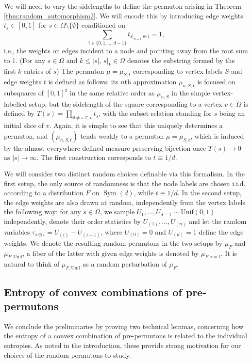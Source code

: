 \documentclass[11pt]{article}
\newcommand{\Sym}{\mathop{\mathrm{Sym}}}
\theoremstyle{definition}
\begin{document}
We will need to vary the sidelengths to define the permuton arising in Theorem \ref{thm:random_automorphism2}. We will encode this by introducing edge weights $t_s\in [0, 1]$ for $s\in {\Omega\setminus\{\emptyset\}}$ conditioned on
$$\sum_{i\in \{0, 1, \dots, d-1\}}t_{s|_{n-1}\oplus i}=1,$$
i.e., the weights on edges incident to a node and pointing away from the root sum to 1. (For any $s\in\Omega$ and $k\leq |s|$, $s|_{k}\in\Omega$ denotes the substring formed by the first $k$ entries of $s$) The permuton $\mu=\mu_{S, t}$ corresponding to vertex labels $S$ and edge weights $t$ is defined as follows: its $n$th approximation $\mu_{n, S, t}$ is focused on subsquares of $[0, 1]^2$ in the same relative order as $\mu_{n, S}$ in the simple vertex-labelled setup, but the sidelength of the square corresponding to a vertex $v\in \Omega$ is defined by $T(s)=\prod_{\emptyset\neq s\subseteq v}t_s$, with the subset relation standing for $s$ being an initial slice of $v$. Again, it is simple to see that this uniquely determines a permuton, and $(\mu_{n, S, t})$ tends weakly to a permuton $\mu=\mu_{S, t}$, which is induced by the almost everywhere defined measure-preserving bijection once $T(s)\to 0$ as $|s|\to\infty$. The first construction corresponds to $t \equiv 1/d$.

We will consider two distinct random choices definable via this formalism. In the first setup, the only source of randomness is that the node labels are chosen i.i.d. according to a distribution $F$ on $\Sym(d)$, while $t\equiv 1/d$. In the second setup, the edge weights are also drawn at random, independently from the vertex labels the following way: for any $s\in \Omega$, we sample $U_1, \dots, U_{d-1}\sim \mathrm{Unif}(0, 1)$ independently, denote their order statistics by $U_{(1)}, \dots, U_{(n)}$ and let the random variables $\tau_{s\oplus i}=U_{(i)}-U_{(i-1)}$, where $U_{(0)}=0$ and $U_{(d)}=1$ define the edge weights. We denote the resulting random permutons in the two setups by $\mu_{F}$ and $\mu_{F, \mathrm{Unif}}$, a fiber of the latter with given edge weights is denoted by $\mu_{F, \tau=t}$. It is natural to think of $\mu_{F, \mathrm{Unif}}$ as a random perturbation of $\mu_{F}$.

\subsection{Entropy of convex combinations of pre-permutons}

We conclude the preliminaries by proving two technical lemmas, concerning how the entropy of a convex combination of pre-permutons is related to the individual entropies. As noted in the introduction, these provide strong motivation for our choices of the random permutons to study.
\end{document}
